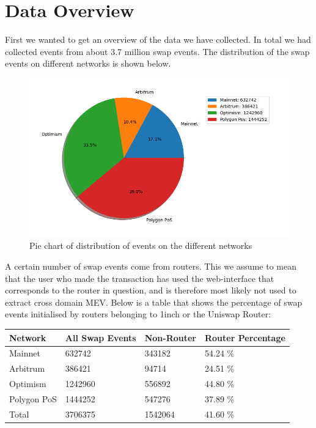 \section{Data Overview} \label{dataover}

First we wanted to get an overview of the data we have collected. In total we had collected events from about 3.7 million swap events. The distribution of the swap events on different networks is shown below.
\begin{figure}[H]
    \centering
    \includegraphics[width=\textwidth]{3_FIGURES/Results/EventDistPlot.PNG}
    \caption{Pie chart of distribution of events on the different networks}
    \label{pieevents}
\end{figure}

A certain number of swap events come from routers. This we assume to mean that the user who made the transaction has used the web-interface that corresponds to the router in question, and is therefore most likely not used to extract cross domain MEV. Below is a table that shows the percentage of swap events initialised by routers belonging to 1inch \cite{1inchprot} or the Uniswap Router:

\begin{table}[h]
\centering
\begin{tabular}{|l|l|l|l|}
\hline
{\color[HTML]{1C1E21} Network}     & {\color[HTML]{1C1E21} All Swap Events} & {\color[HTML]{1C1E21} Non-Router} & Router Percentage \\ \hline
{\color[HTML]{1C1E21} Mainnet}     & {\color[HTML]{1C1E21} 632742}          & {\color[HTML]{1C1E21} 343182}     & 54.24 \%          \\ \hline
{\color[HTML]{1C1E21} Arbitrum}    & {\color[HTML]{1C1E21} 386421}          & {\color[HTML]{1C1E21} 94714}      & 24.51 \%          \\ \hline
{\color[HTML]{1C1E21} Optimism}    & {\color[HTML]{1C1E21} 1242960}         & {\color[HTML]{1C1E21} 556892}     & 44.80 \%          \\ \hline
{\color[HTML]{1C1E21} Polygon PoS} & {\color[HTML]{1C1E21} 1444252}         & {\color[HTML]{1C1E21} 547276}     & 37.89 \%          \\ \hline
{\color[HTML]{1C1E21} Total}       & {\color[HTML]{1C1E21} 3706375}         & {\color[HTML]{1C1E21} 1542064}    & 41.60 \%          \\ \hline
\end{tabular}
\end{table}

